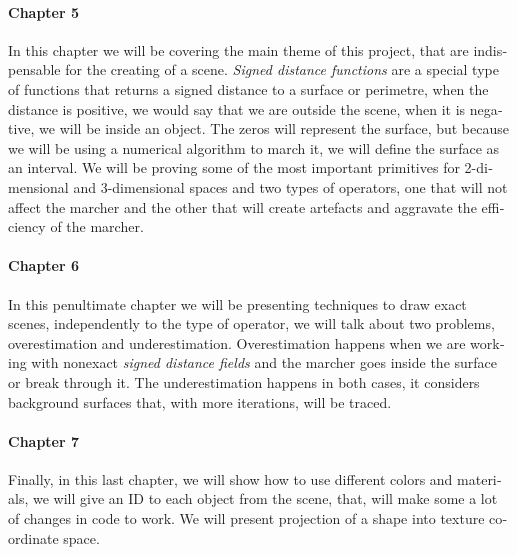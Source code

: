 \begin{otherlanguage}{english}
\paragraph{Chapter 5} In this chapter we will be covering the main theme of this project, that are indispensable for the creating of a scene. \textit{Signed distance functions} are a special type of functions that returns a signed distance to a surface or perimetre, when the distance is positive, we would say that we are outside the scene, when it is negative, we will be inside an object. The zeros will represent the surface, but because we will be using a numerical algorithm to march it, we will define the surface as an interval. We will be proving some of the most important primitives for 2-dimensional and 3-dimensional spaces and two types of operators, one that will not affect the marcher and the other that will create artefacts and aggravate the efficiency of the marcher.

\paragraph{Chapter 6} In this penultimate chapter we will be presenting techniques to draw exact scenes, independently to the type of operator, we will talk about two problems, overestimation and underestimation. Overestimation happens when we are working with nonexact \textit{signed distance fields} and the marcher goes inside the surface or break through it. The underestimation happens in both cases, it considers background surfaces that, with more iterations, will be traced.

\paragraph{Chapter 7} Finally, in this last chapter, we will show how to use different colors and materials, we will give an ID to each object from the scene, that, will make some a lot of changes in code to work. We will present projection of a shape into texture coordinate space.

\vspace{0.7cm}

\end{otherlanguage}

